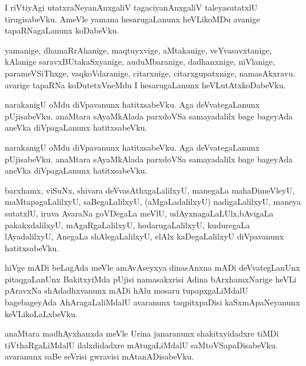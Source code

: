 \documentclass{article}
\begin{document}
\begin{mn}%
I riVtiyAgi utatxraNeyanAnxgaliV tagaciyanAnxgaliV taleyasutatxlU tirugisabeVku. AmeVle yamana 
hesarugaLanunx heVLikoMDu avanige tapaRNagaLanunx koDabeVku.
\end{mn}

\begin{mn}%
yamanige, dhamaRrAhanige, maqtuyxvige, aMtakanige, veYvasavxtanige, kAlanige saravxBUtakaSxyanige, 
auduMbaranige, dadhanxnige, niVlanige, parameVSiThxge, vaqkoVdaranige, citarxnige, 
citarxgupatxnige, namasAkxravu. avarige tapaRNa koDutetxVneMdu I hesarugaLanunx heVLutAtxkoDabeVku.
\end{mn}

\begin{mn}%
narakanigU oMdu diVpavanunx hatitxsabeVku. Aga deVvategaLanunx pUjisabeVku. anaMtara sAyaMkAlada 
parxdoVSa samayadalilx bage bageyAda aneVka diVpagaLanunx hatitxsabeVku.
\end{mn}

\begin{mn}%
narakanigU oMdu diVpavanunx hatitxsabeVku. Aga deVvategaLanunx pUjisabeVku. anaMtara sAyaMkAlada 
parxdoVSa samayadalilx bage bageyAda aneVka diVpagaLanunx hatitxsabeVku.
\end{mn}

\begin{mn}%
barxhamx, viSuNx, shivara deVvasAthxgaLalilxyU, manegaLa mahaDimeVleyU, maMtapagaLalilxyU, 
saBegaLalilxyU, (aMgaLadalilxyU) nadigaLalilxyU, maneya sutatxlU, iruva AvaraNa goVDegaLa meVlU, 
udAyxnagaLaLUlx,bAvigaLa pakakxdalilxyU, mAgaRgaLalilxyU, hodarugaLalilxyU, kuduregaLa 
lAyadalilxyU, AnegaLa shAlegaLalilxyU, elAlx kaDegaLalilxyU diVpavanunx hatitxsabeVku.
\end{mn}

\begin{mn}%
hiVge mADi beLagAda meVle amAvAseyxya dinasAnxna mADi deVvategLanUnx pitaqgaLanUnx BakitxyiMda 
pUjisi namasakxrisi Adina bArxhamxNarige heVLi pAravxNa shAdadhxvanunx mADi hAlu mosaru 
tupapxgaLiMdalU bagebageyAda AhAragaLaliMdalU avaranunx taqpitxpaDisi kaSxmApaNeyanunx 
keVLikoLaLxbeVku.
\end{mn}

\begin{mn}%
anaMtara madhAyxhanxda meVle Urina janaranunx shakitxyidadxre tiMDi tiVthaRgaLiMdalU ilalxdidadxre 
mAtugaLiMdalU saMtoVSapaDisabeVku. avaranunx saBe seVrisi gwravisi mAtanADisabeVku.
\end{mn}
\end{document}

